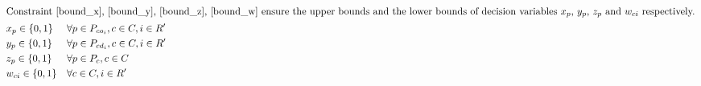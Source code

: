\begin{align}
  \intertext{Constraint \eqref{bound_x}, \eqref{bound_y}, \eqref{bound_z}, \eqref{bound_w} ensure the upper bounds and the lower bounds of decision variables $x_p$, $y_p$, $z_p$ and $w_{ci}$ respectively.}
  & x_p \in \{0, 1\} && \forall p \in P_{co_i}, c \in C, i \in R' \label{bound_x} \\
  & y_p \in \{0, 1\} && \forall p \in P_{cd_i}, c \in C, i \in R' \label{bound_y} \\
  & z_p \in \{0, 1\} && \forall p \in P_c, c \in C \label{bound_z} \\
  & w_{ci} \in \{0, 1\} && \forall c \in C, i \in R' \label{bound_w}
\end{align}
